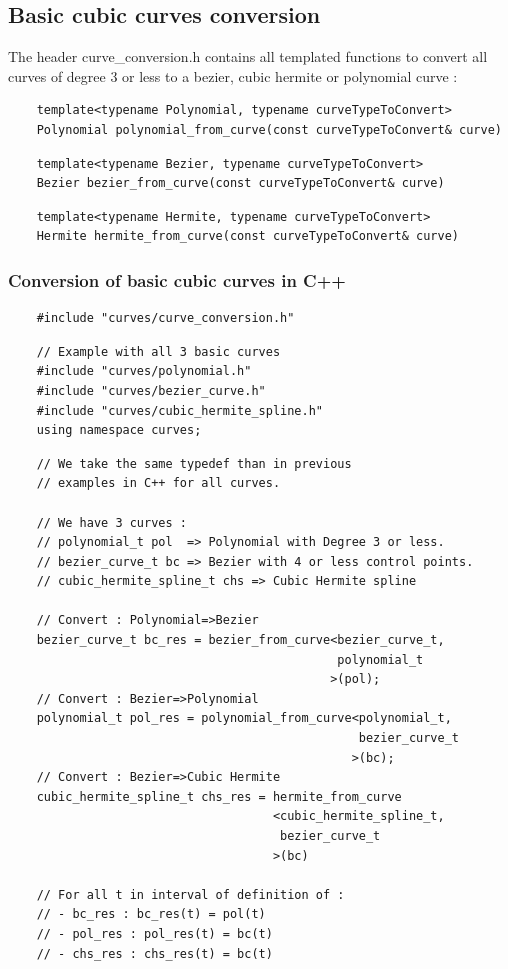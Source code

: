 \documentclass{article}
\begin{document}
\subsection{Basic cubic curves conversion}
    The header curve\_conversion.h contains all templated functions to convert all curves of degree 3 or less to a bezier, cubic hermite or polynomial curve :
    \begin{lstlisting}
    template<typename Polynomial, typename curveTypeToConvert>
    Polynomial polynomial_from_curve(const curveTypeToConvert& curve)
    \end{lstlisting}
    \begin{lstlisting}
    template<typename Bezier, typename curveTypeToConvert>
    Bezier bezier_from_curve(const curveTypeToConvert& curve)
    \end{lstlisting}
    \begin{lstlisting}
    template<typename Hermite, typename curveTypeToConvert>
    Hermite hermite_from_curve(const curveTypeToConvert& curve)
    \end{lstlisting}
    
    \subsubsection{Conversion of basic cubic curves in C++}
    \begin{lstlisting}
    #include "curves/curve_conversion.h"
    \end{lstlisting}
    \begin{lstlisting}
    // Example with all 3 basic curves
    #include "curves/polynomial.h"
    #include "curves/bezier_curve.h"
    #include "curves/cubic_hermite_spline.h"
    using namespace curves;
    \end{lstlisting}
    \begin{lstlisting}
    // We take the same typedef than in previous
    // examples in C++ for all curves.
    
    // We have 3 curves :
    // polynomial_t pol  => Polynomial with Degree 3 or less.
    // bezier_curve_t bc => Bezier with 4 or less control points.
    // cubic_hermite_spline_t chs => Cubic Hermite spline
    
    // Convert : Polynomial=>Bezier
    bezier_curve_t bc_res = bezier_from_curve<bezier_curve_t, 
                                              polynomial_t
                                             >(pol);
    // Convert : Bezier=>Polynomial
    polynomial_t pol_res = polynomial_from_curve<polynomial_t,
                                                 bezier_curve_t 
                                                >(bc);
    // Convert : Bezier=>Cubic Hermite
    cubic_hermite_spline_t chs_res = hermite_from_curve
                                     <cubic_hermite_spline_t,
                                      bezier_curve_t
                                     >(bc)
                                     
    // For all t in interval of definition of :
    // - bc_res : bc_res(t) = pol(t)
    // - pol_res : pol_res(t) = bc(t)
    // - chs_res : chs_res(t) = bc(t)
    \end{lstlisting}
    
\end{document}
